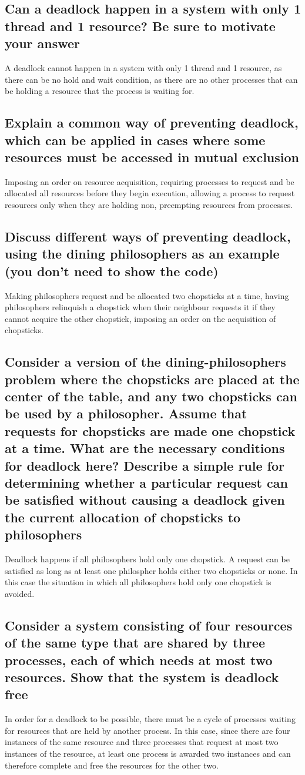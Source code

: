 \documentclass{article}
\begin{document}
\subsection{Can a deadlock happen in a system with only 1 thread and 1 resource? Be sure to motivate your answer}
A deadlock cannot happen in a system with only 1 thread and 1 resource, as there can be no hold and wait condition, as there are no other processes that can be holding a resource that the process is waiting for.

\subsection{Explain a common way of preventing deadlock, which can be applied in cases where some resources must be accessed in mutual exclusion}
Imposing an order on resource acquisition, requiring processes to request and be allocated all resources before they begin execution, allowing a process to request resources only when they are holding non, preempting resources from processes.

\subsection{Discuss different ways of preventing deadlock, using the dining philosophers as an example (you don't need to show the code)}
Making philosophers request and be allocated two chopsticks at a time, having philosophers relinquish a chopstick when their neighbour requests it if they cannot acquire the other chopstick, imposing an order on the acquisition of chopsticks. 
\subsection{Consider a version of the dining-philosophers problem where the chopsticks are placed at the center of the table, and any two chopsticks can be used by a philosopher. Assume that requests for chopsticks are made one chopstick at a time. What are the necessary conditions for deadlock here? Describe a simple rule for determining whether a particular request can be satisfied without causing a deadlock given the current allocation of chopsticks to philosophers}
Deadlock happens if all philosophers hold only one chopstick. A request can be satisfied as long as at least one philospher holds either two chopsticks or none. In this case the situation in which all philosophers hold only one chopstick is avoided.

\subsection{Consider a system consisting of four resources of the same type that are shared by three processes, each of which needs at most two resources. Show that the system is deadlock free}
In order for a deadlock to be possible, there must be a cycle of processes waiting for resources that are held by another process. In this case, since there are four instances of the same resource and three processes that request at most two instances of the resource, at least one process is awarded two instances and can therefore complete and free the resources for the other two.
\end{document}
